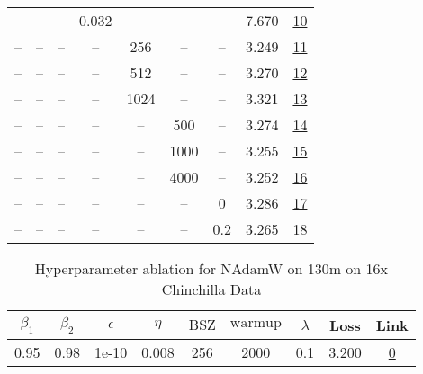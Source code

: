 \begin{table}[H]
\begin{tabular}{ccccccccc}
-- & -- & -- & 0.032 & -- & -- & -- & 7.670 & \href{https://wandb.ai/stanford-mercury/optimizer-scaling/runs/sweep-130m-21B-nadamwe5520alr0.032-wd0.1-minlr0-warmup2000-b10.9-07e730}{10} \\
-- & -- & -- & -- & 256 & -- & -- & 3.249 & \href{https://wandb.ai/stanford-mercury/optimizer-scaling/runs/sweep-130m-21B-nadamwaee88elr0.008-wd0.1-minlr0-warmup2000-b10.9-67ec21}{11} \\
-- & -- & -- & -- & 512 & -- & -- & 3.270 & \href{https://wandb.ai/stanford-mercury/optimizer-scaling/runs/sweep-130m-21B-nadamw1c5657lr0.008-wd0.1-minlr0-warmup2000-b10.9-7ae1bd}{12} \\
-- & -- & -- & -- & 1024 & -- & -- & 3.321 & \href{https://wandb.ai/stanford-mercury/optimizer-scaling/runs/sweep-130m-21B-nadamw96aba0lr0.008-wd0.1-minlr0-warmup2000-b10.9-70c7d9}{13} \\
-- & -- & -- & -- & -- & 500 & -- & 3.274 & \href{https://wandb.ai/stanford-mercury/optimizer-scaling/runs/sweep-130m-21B-nadamw2fe9a1lr0.008-wd0.1-minlr0-warmup500-b10.95-2fd100}{14} \\
-- & -- & -- & -- & -- & 1000 & -- & 3.255 & \href{https://wandb.ai/stanford-mercury/optimizer-scaling/runs/sweep-130m-21B-nadamwcc80a2lr0.008-wd0.1-minlr0-warmup1000-b10.9-9cc711}{15} \\
-- & -- & -- & -- & -- & 4000 & -- & 3.252 & \href{https://wandb.ai/stanford-mercury/optimizer-scaling/runs/sweep-130m-21B-nadamwecfbe6lr0.008-wd0.1-minlr0-warmup4000-b10.9-5679b9}{16} \\
-- & -- & -- & -- & -- & -- & 0 & 3.286 & \href{https://wandb.ai/stanford-mercury/optimizer-scaling/runs/sweep-130m-21B-nadamw4cd581lr0.008-wd0-minlr0-warmup2000-b10.95--646f8d}{17} \\
-- & -- & -- & -- & -- & -- & 0.2 & 3.265 & \href{https://wandb.ai/stanford-mercury/optimizer-scaling/runs/sweep-130m-21B-nadamw602ff2lr0.008-wd0.2-minlr0-warmup2000-b10.9-577a26}{18} \\
\bottomrule
\end{tabular}
\end{table}

\begin{table}[H]
\centering
\caption{Hyperparameter ablation for NAdamW on 130m on 16x Chinchilla Data}
\label{tab:ablation_nadamw_130m_16}
\begin{tabular}{ccccccccc}
\toprule
$\beta_1$ & $\beta_2$ & $\epsilon$ & $\eta$ & $\mathrm{BSZ}$ & $\mathrm{warmup}$ & $\lambda$ & Loss & Link \\
\midrule
0.95 & 0.98 & 1e-10 & 0.008 & 256 & 2000 & 0.1 & 3.200 & \href{https://wandb.ai/stanford-mercury/optimizer-scaling/runs/sweep-130m-42B-nadamw6383f8lr0.008-wd0.1-minlr0-warmup2000-b10.9-d7e8d3}{0} \\
\midrule
\bottomrule
\end{tabular}
\end{table}

